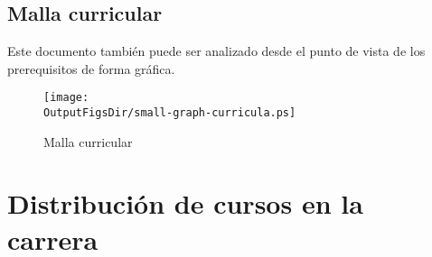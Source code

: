 

% 

\begin{landscape}

\end{landscape}

\begin{landscape}
\section{Malla curricular}\label{sec:vision-grafica}
\vspace{-0.3cm}Este documento también puede ser analizado desde el punto de vista de los prerequisitos de forma gráfica.
\begin{figure}[h!]
      \texttt{[image: \\OutputFigsDir/small-graph-curricula.ps]}
      \label{fig:malla-curricular}
      \caption{Malla curricular \SchoolFullName}
\end{figure}
\end{landscape}

\section{Distribución de cursos en la carrera}

% 
% 
% 
% 
